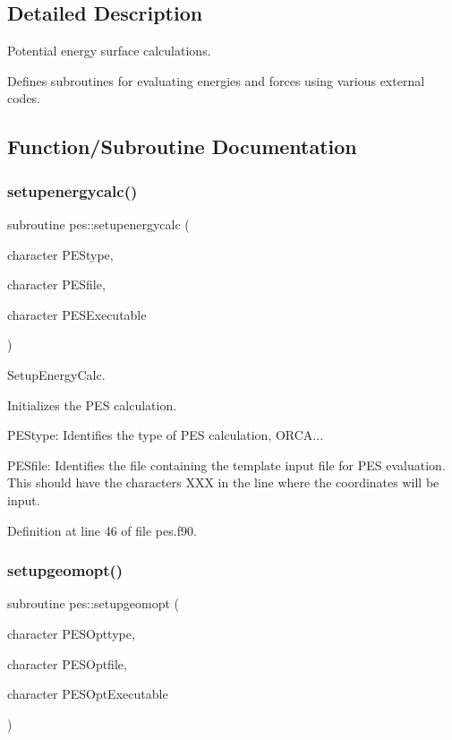 \subsection{Detailed Description}
Potential energy surface calculations. 

Defines subroutines for evaluating energies and forces using various external codes. 

\subsection{Function/\+Subroutine Documentation}
\mbox{\label{namespacepes_a836bf4b305457df700a5520d6d505ee7}} 
\subsubsection{\texorpdfstring{setupenergycalc()}{setupenergycalc()}}
{\footnotesize\ttfamily subroutine pes\+::setupenergycalc (\begin{DoxyParamCaption}\item[{character}]{P\+E\+Stype,  }\item[{character}]{P\+E\+Sfile,  }\item[{character}]{P\+E\+S\+Executable }\end{DoxyParamCaption})}



Setup\+Energy\+Calc. 

Initializes the P\+ES calculation.


\begin{DoxyItemize}
\item P\+E\+Stype\+: Identifies the type of P\+ES calculation, \textquotesingle{}O\+R\+CA\textquotesingle{}...
\item P\+E\+Sfile\+: Identifies the file containing the template input file for P\+ES evaluation. This should have the characters \textquotesingle{}X\+XX\textquotesingle{} in the line where the coordinates will be input. 
\end{DoxyItemize}

Definition at line 46 of file pes.\+f90.

\mbox{\label{namespacepes_a4a1ef51f594097f9dfce8ebcdf864782}} 
\subsubsection{\texorpdfstring{setupgeomopt()}{setupgeomopt()}}
{\footnotesize\ttfamily subroutine pes\+::setupgeomopt (\begin{DoxyParamCaption}\item[{character}]{P\+E\+S\+Opttype,  }\item[{character}]{P\+E\+S\+Optfile,  }\item[{character}]{P\+E\+S\+Opt\+Executable }\end{DoxyParamCaption})}



